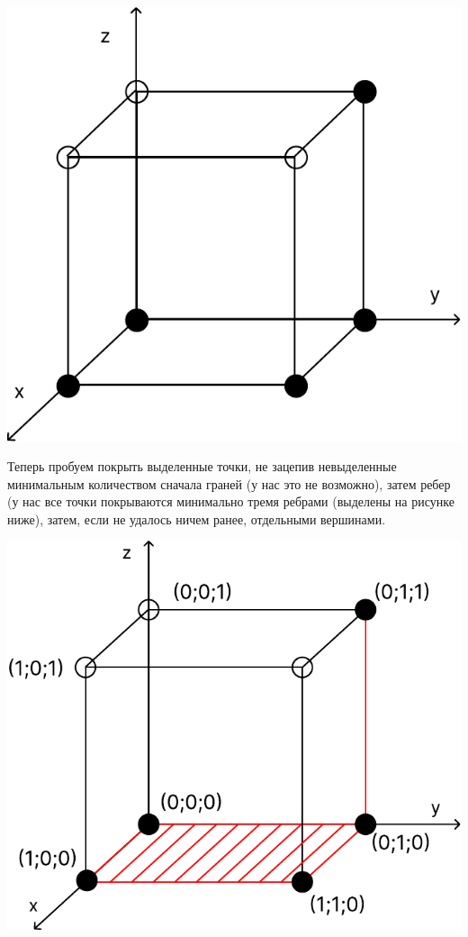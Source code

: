 \documentclass[11pt]{article}
\begin{document}
\includegraphics{t7.pdf}

Теперь пробуем покрыть выделенные точки, не зацепив невыделенные
минимальным количеством сначала граней (у нас это не возможно), затем ребер
(у нас все точки покрываются минимально тремя ребрами (выделены на
рисунке ниже), затем, если не удалось ничем ранее, отдельными вершинами.

\includegraphics{t7_2.pdf}
\end{document}
